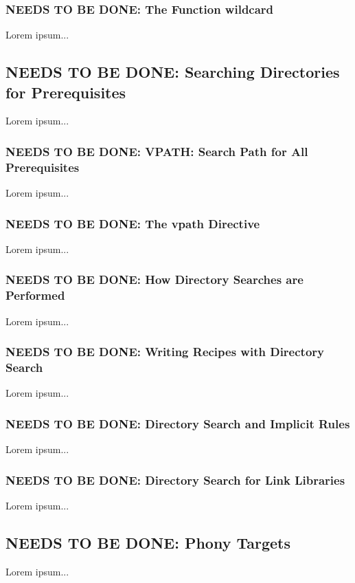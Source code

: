 \documentclass{charun}
\begin{document}
\begin{multicols*}{2}
\color{gray}
\subsubsection{NEEDS TO BE DONE: The Function wildcard}
Lorem ipsum...
\color{black}

\color{gray}
\subsection{NEEDS TO BE DONE: Searching Directories for Prerequisites}
Lorem ipsum...
\color{black}

\color{gray}
\subsubsection{NEEDS TO BE DONE: VPATH: Search Path for All Prerequisites}
Lorem ipsum...
\color{black}

\color{gray}
\subsubsection{NEEDS TO BE DONE: The vpath Directive}
Lorem ipsum...
\color{black}

\color{gray}
\subsubsection{NEEDS TO BE DONE: How Directory Searches are Performed}
Lorem ipsum...
\color{black}

\color{gray}
\subsubsection{NEEDS TO BE DONE: Writing Recipes with Directory Search}
Lorem ipsum...
\color{black}

\color{gray}
\subsubsection{NEEDS TO BE DONE: Directory Search and Implicit Rules}
Lorem ipsum...
\color{black}

\color{gray}
\subsubsection{NEEDS TO BE DONE: Directory Search for Link Libraries}
Lorem ipsum...
\color{black}

\color{gray}
\subsection{NEEDS TO BE DONE: Phony Targets}
Lorem ipsum...
\color{black}


\end{multicols*}
\end{document}
